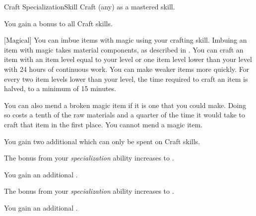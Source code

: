     \begin{feat}{Craft Specialization}{Skill}
        \featpre Craft (any) as a mastered skill.

         You gain a  bonus to all Craft skills.

        [Magical] You can imbue items with magic using your crafting skill.
        Imbuing an item with magic takes material components, as described in .
        You can craft an item with an item level equal to your level or one item level lower than your level with 24 hours of continuous work.
        You can make weaker items more quickly.
        For every two item levels lower than your level, the time required to craft an item is halved, to a minimum of 15 minutes.

        You can also mend a broken magic item if it is one that you could make.
        Doing so costs a tenth of the raw materials and a quarter of the time it would take to craft that item in the first place.
        You cannot mend a  magic item.

         You gain two additional  which can only be spent on Craft skills.

         The bonus from your \textit{specialization} ability increases to .

         You gain an additional .

         The bonus from your \textit{specialization} ability increases to .

         You gain an additional .
    \end{feat}

